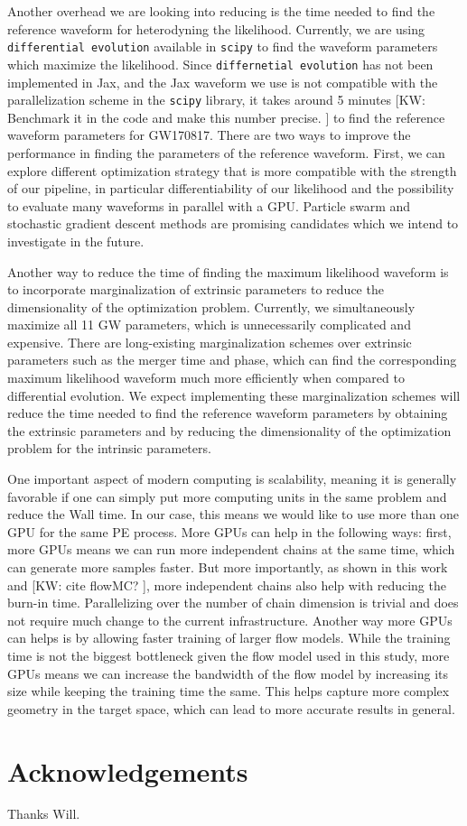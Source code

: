 \documentclass[twocolumn]{aastex631}
\newcommand{\kw}[1]{{\color{rb4}[KW: #1 ]}}
\begin{document}
Another overhead we are looking into reducing is the time needed to find the
reference waveform for heterodyning the likelihood. Currently, we are using
\texttt{differential evolution} \cite{Storn1997DifferentialE} available in
\texttt{scipy} to find the waveform parameters which maximize the likelihood.
Since \texttt{differnetial evolution} has not been implemented in Jax, and the
Jax waveform we use is not compatible with the parallelization scheme in the
\texttt{scipy} library, it takes around 5 minutes \kw{Benchmark it in the code
and make this number precise.} to find the reference waveform parameters for
GW170817. There are two ways to improve the performance in finding the
parameters of the reference waveform. First, we can explore different
optimization strategy that is more compatible with the strength of our pipeline,
in particular differentiability of our likelihood and the possibility to
evaluate many waveforms in parallel with a GPU. Particle swarm \cite{7869491}
and stochastic gradient descent methods \cite{10.5555/304710.304720} are
promising candidates which we intend to investigate in the future. 

Another way to reduce the time of finding the maximum likelihood waveform is to
incorporate marginalization of extrinsic parameters to reduce the dimensionality
of the optimization problem. Currently, we simultaneously maximize all 11 GW
parameters, which is unnecessarily complicated and expensive. There are
long-existing marginalization schemes over extrinsic parameters such as the merger
time and phase, which can find the corresponding maximum likelihood waveform
much more efficiently when compared to differential evolution. We expect
implementing these marginalization schemes will reduce the time needed to find
the reference waveform parameters by obtaining the extrinsic parameters and by
reducing the dimensionality of the optimization problem for the intrinsic
parameters.

One important aspect of modern computing is scalability, meaning it is generally
favorable if one can simply put more computing units in the same problem and
reduce the Wall time. In our case, this means we would like to use more than one
GPU for the same PE process. More GPUs can help in the following ways: first,
more GPUs means we can run more independent chains at the same time, which can
generate more samples faster. But more importantly, as shown in this work and
\kw{cite flowMC?}, more independent chains also help with reducing the burn-in
time. Parallelizing over the number of chain dimension is trivial and does not
require much change to the current infrastructure. Another way more GPUs can
helps is by allowing faster training of larger flow models. While the training time
is not the biggest bottleneck given the flow model used in this study, more GPUs
means we can increase the bandwidth of the flow model by increasing its size
while keeping the training time the same. This helps capture more complex
geometry in the target space, which can lead to more accurate results in general.


\section{Acknowledgements}
Thanks Will.


\end{document}
